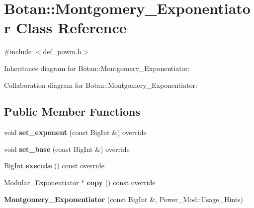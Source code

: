 \hypertarget{class_botan_1_1_montgomery___exponentiator}{}\section{Botan\+:\+:Montgomery\+\_\+\+Exponentiator Class Reference}
\label{class_botan_1_1_montgomery___exponentiator}


{\ttfamily \#include $<$def\+\_\+powm.\+h$>$}



Inheritance diagram for Botan\+:\+:Montgomery\+\_\+\+Exponentiator\+:


Collaboration diagram for Botan\+:\+:Montgomery\+\_\+\+Exponentiator\+:
\subsection*{Public Member Functions}
\begin{DoxyCompactItemize}
\item 
\mbox{\label{class_botan_1_1_montgomery___exponentiator_a780e8722e8092300f645db19002db2e1}} 
void {\bfseries set\+\_\+exponent} (const Big\+Int \&) override
\item 
\mbox{\label{class_botan_1_1_montgomery___exponentiator_a53a346e08dbef06d89d9b00615a1ad76}} 
void {\bfseries set\+\_\+base} (const Big\+Int \&) override
\item 
\mbox{\label{class_botan_1_1_montgomery___exponentiator_a6e14c455adae814d179754ef474c960f}} 
Big\+Int {\bfseries execute} () const override
\item 
\mbox{\label{class_botan_1_1_montgomery___exponentiator_a0328fe9260d44e935674c0d51a64e9cc}} 
Modular\+\_\+\+Exponentiator $\ast$ {\bfseries copy} () const override
\item 
\mbox{\label{class_botan_1_1_montgomery___exponentiator_a6ffe9ff12d0d44ec2960bab2e523c9f6}} 
{\bfseries Montgomery\+\_\+\+Exponentiator} (const Big\+Int \&, Power\+\_\+\+Mod\+::\+Usage\+\_\+\+Hints)
\end{DoxyCompactItemize}


